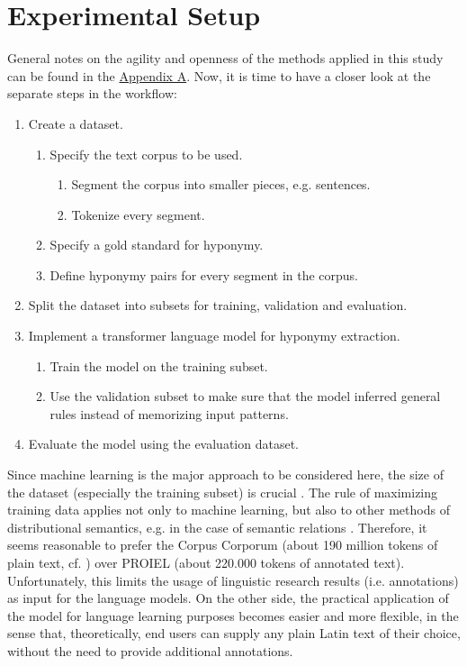 \documentclass[oneside]{book}
\begin{document}
\section{Experimental Setup}
General notes on the agility and openness of the methods applied in this study can be found in the \hyperref[sec:appendixA]{Appendix A}. Now, it is time to have a closer look at the separate steps in the workflow:
\begin{enumerate}
         \item Create a dataset.
         \begin{enumerate}
		\item Specify the text corpus to be used.
		 \begin{enumerate}
			\item Segment the corpus into smaller pieces, e.g. sentences.
			\item Tokenize every segment.
		\end{enumerate}
		\item Specify a gold standard for hyponymy.
		\item Define hyponymy pairs for every segment in the corpus.
	\end{enumerate}
         \item Split the dataset into subsets for training, validation and evaluation.
         \item Implement a transformer language model \parencite{vaswaniAttentionAllYou2017} for hyponymy extraction.
         \begin{enumerate}
		\item Train the model on the training subset.
		\item Use the validation subset to make sure that the model inferred general rules instead of memorizing input patterns.
	\end{enumerate}
         \item Evaluate the model using the evaluation dataset.
\end{enumerate}
Since machine learning is the major approach to be considered here, the size of the dataset (especially the training subset) is crucial \parencite[13]{hestnessDeepLearningScaling2017}. The rule of maximizing training data applies not only to machine learning, but also to other methods of distributional semantics, e.g. in the case of semantic relations \parencite[27]{herbelotBuildingSharedWorld2015}. Therefore, it seems reasonable to prefer the Corpus Corporum (about 190 million tokens of plain text, cf. \textcite{roelliCorpusCorporumNew2014}) over PROIEL (about 220.000 tokens of annotated text). Unfortunately, this limits the usage of linguistic research results (i.e. annotations) as input for the language models. On the other side, the practical application of the model for language learning purposes becomes easier and more flexible, in the sense that, theoretically, end users can supply any plain Latin text of their choice, without the need to provide additional annotations.
\end{document}
